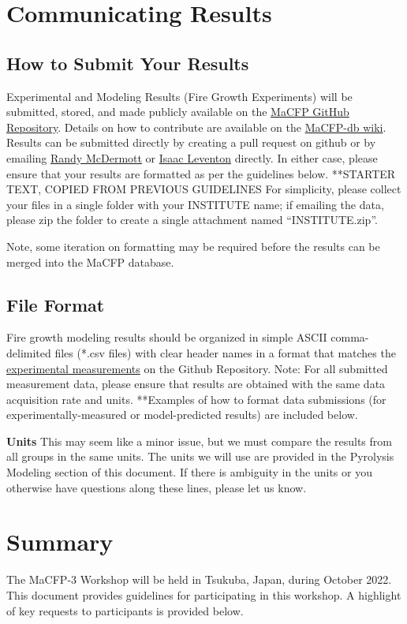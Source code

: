 \documentclass[12pt]{article}
\begin{document}
\clearpage
\section{Communicating Results}
\subsection{How to Submit Your Results}
Experimental and Modeling Results (Fire Growth Experiments) will be submitted, stored, and made publicly available on the \href{https://github.com/MaCFP/macfp-db/Fire_Growth}{MaCFP GitHub Repository}. Details on how to contribute are available on the \href{https://github.com/MaCFP/macfp-db/wiki/How-to-Contribute}{MaCFP-db wiki}. Results can be submitted directly by creating a pull request on github or by emailing \href{mailto:randy.mcdermott@gmail.com}{Randy McDermott} or \href{mailto:isaac.leventon@gmail.com}{Isaac Leventon} directly. In either case, please ensure that your results are formatted as per the guidelines below.
**STARTER TEXT, COPIED FROM PREVIOUS GUIDELINES
For simplicity, please collect your files in a single folder with your INSTITUTE name; if emailing the data, please zip the folder to create a single attachment named “INSTITUTE.zip”. 

Note, some iteration on formatting may be required before the results can be merged into the MaCFP database.
\subsection{File Format}
Fire growth modeling results should be organized in simple ASCII comma-delimited files (*.csv files) with clear header names in a format that matches the \href{https://github.com/MaCFP/macfp-db/tree/master/Fire_Growth}{experimental measurements} on the Github Repository. Note: For all submitted measurement data, please ensure that results are obtained with the same data acquisition rate and units. **Examples of how to format data submissions (for experimentally-measured or model-predicted results) are included below.

\textbf{Units}
This may seem like a minor issue, but we must compare the results from all groups in the same units. The units we will use are provided in the Pyrolysis Modeling section of this document. If there is ambiguity in the units or you otherwise have questions along these lines, please let us know.

\clearpage
\section{Summary}
The MaCFP-3 Workshop will be held in Tsukuba, Japan, during October 2022. This document provides guidelines for participating in this workshop. A highlight of key requests to participants is provided below.
\end{document}
